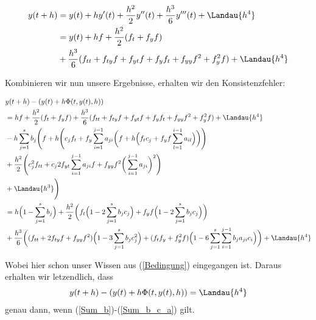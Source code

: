 \begin{solution}
\begin{align*}
y(t+h) &= y(t) + hy'(t) + \frac{h^2}{2}y''(t)+\frac{h^3}{6}y'''(t) + \Landau{h^4} \\
&= y(t) + hf + \frac{h^2}{2}(f_t + f_yf)\\
&+ \frac{h^3}{6}(f_{tt} + f_{ty}f + f_{yt}f+ f_yf_t + f_{yy} f^2 + f_y^2 f)
+ \Landau{h^4}
\end{align*}

Kombinieren wir nun unsere Ergebnisse, erhalten wir den Konsistenzfehler:

\begin{align*}
  &y(t+h) - (y(t) + h \Phi(t,y(t),h)) \\
  &=hf +\frac{h^2}{2}(f_t + f_yf)
  + \frac{h^3}{6}(f_{tt} + f_{ty}f + f_{yt}f+ f_yf_t + f_{yy} f^2 + f_y^2 f)
  + \Landau{h^4} \\
  &- h \sum_{j=1}^s b_j\Bigg(
  f + h\Bigg(c_j f_t + f_y \sum_{i=1}^{j-1} a_{ji}
  \bigg( f + h \Big( f_t c_j + f_y f \sum_{l=1}^{i-1}a_{il}
  \Big)
  \bigg) \Bigg) \\
  &+ \frac{h^2}{2} \Bigg( c_j^2 f_{tt} +c_j 2f_{yt} \sum_{i=1}^{j-1} a_{ji} f
  + f_{yy} f^2 \bigg( \sum_{i=1}^{j-1} a_{ji}
  \bigg)^2 \Bigg)\\
  &+ \Landau{h^3}\Bigg) \\
  &= h\Big(1-\sum_{j=1}^s b_j \Big)
  + \frac{h^2}{2}
  \bigg( f_t \Big(1-2\sum_{j=1}^s b_jc_j \Big)
  + f_yf \Big(1-2\sum_{j=1}^s b_jc_j \Big)
  \bigg) \\
  &+ \frac{h^3}{6}
  \bigg(
  (f_{tt}+2f_{ty}f+f_{yy}f^2) \Big( 1-3\sum_{j=1}^s b_j c_j^2 \Big) +
  (f_tf_y +f_y^2f) \Big(1-6 \sum_{j=1}^s\sum_{i=1}^{j-1} b_j a_{ji} c_i \Big)
  \bigg) + \Landau{h^4}
\end{align*}

Wobei hier schon unser Wissen aus (\ref{Bedingung}) eingegangen ist.
Daraus erhalten wir letzendlich, dass
\begin{align*}
  y(t+h) - (y(t) + h \Phi(t,y(t),h)) = \Landau{h^4}
\end{align*}
genau dann, wenn (\ref{Sum_b})-(\ref{Sum_b_c_a}) gilt.
\end{solution}
